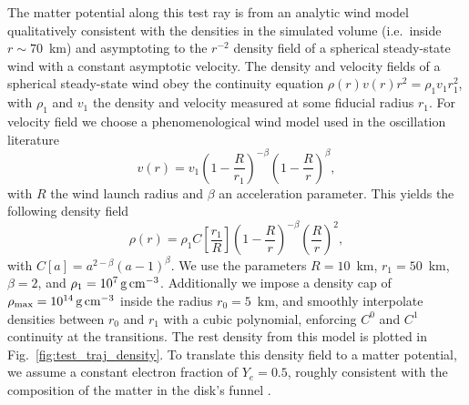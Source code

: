 \documentclass[aps,floatfix,prd,superscriptaddress,twocolumn]{revtex4-1}
\begin{document}
The matter potential along this test ray is from an analytic wind
model qualitatively consistent with the densities in the
simulated volume (i.e.\ inside $r\sim70$~km) and asymptoting to the $r^{-2}$
density field of a spherical steady-state wind with a constant asymptotic
velocity.
The density and velocity fields of a spherical steady-state wind
obey the continuity equation $\rho(r)v(r)r^2=\rho_1 v_1 r_1^2$,
with $\rho_1$ and $v_1$ the density and velocity measured at some fiducial
radius $r_1$.
For velocity field we choose a phenomenological wind model used in the
oscillation literature \cite{surm2005-nu_and_grb_outflows}
\begin{equation}
  v(r) = v_1 \left(1-\frac{R}{r_1}\right)^{-\beta}
  \left(1-\frac{R}{r}\right)^{\beta},
\end{equation}
with $R$ the wind launch radius and $\beta$ an acceleration parameter.
This yields the following density field
\begin{equation}
  \rho(r)=\rho_1 C\left[\frac{r_1}{R}\right]
  \left(1-\frac{R}{r}\right)^{-\beta}\left(\frac{R}{r}\right)^2,
\end{equation}
with $C[a]=a^{2-\beta}(a-1)^\beta$.
We use the parameters $R=10$~km, $r_1=50$~km, $\beta=2$,
and $\rho_1=10^7\,{\rm g}\,{\rm cm}^{-3}$.
Additionally we impose a density cap of
$\rho_{\rm max}=10^{14}\,{\rm g}\,{\rm cm}^{-3}$ inside the radius $r_0=5$~km,
and smoothly interpolate densities between $r_0$ and $r_1$ with a cubic polynomial,
enforcing $C^0$ and $C^1$ continuity at the transitions.
The rest density from this model is plotted in Fig.~\ref{fig:test_traj_density}.
To translate this density field to a matter potential, we assume a constant
electron fraction of $Y_e=0.5$, roughly consistent with the composition of the
matter in the disk's funnel \cite[Fig.~8]{fouc2016-m1_evolve_n}.
\end{document}
